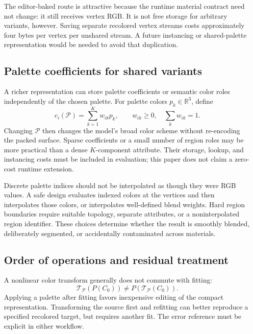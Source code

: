 \documentclass[11pt,letterpaper]{article}
\newcommand{\R}{\mathbb{R}}
\begin{document}
The editor-baked route is attractive because the runtime material contract need not change: it still receives vertex RGB. It is not free storage for arbitrary variants, however. Saving separate recolored vertex streams costs approximately four bytes per vertex per unshared stream. A future instancing or shared-palette representation would be needed to avoid that duplication.

\subsection{Palette coefficients for shared variants}
A richer representation can store palette coefficients or semantic color roles independently of the chosen palette. For palette colors $p_k\in\R^3$, define
\begin{equation}
c_i(\mathcal P)=\sum_{k=1}^{K}w_{ik}p_k,
\qquad w_{ik}\ge0,\quad \sum_k w_{ik}=1.
\label{eq:paletteweights}
\end{equation}
Changing $\mathcal P$ then changes the model's broad color scheme without re-encoding the packed surface. Sparse coefficients or a small number of region roles may be more practical than a dense $K$-component attribute. Their storage, lookup, and instancing costs must be included in evaluation; this paper does not claim a zero-cost runtime extension.

Discrete palette indices should not be interpolated as though they were RGB values. A safe design evaluates indexed colors at the vertices and then interpolates those colors, or interpolates well-defined blend weights. Hard region boundaries require suitable topology, separate attributes, or a noninterpolated region identifier. These choices determine whether the result is smoothly blended, deliberately segmented, or accidentally contaminated across materials.

\subsection{Order of operations and residual treatment}
A nonlinear color transform generally does not commute with fitting:
\begin{equation}
\mathcal T_{\mathcal P}\!\left(P(C_0)\right)
\ne P\!\left(\mathcal T_{\mathcal P}(C_0)\right).
\label{eq:noncommute}
\end{equation}
Applying a palette after fitting favors inexpensive editing of the compact representation. Transforming the source first and refitting can better reproduce a specified recolored target, but requires another fit. The error reference must be explicit in either workflow.
\end{document}
